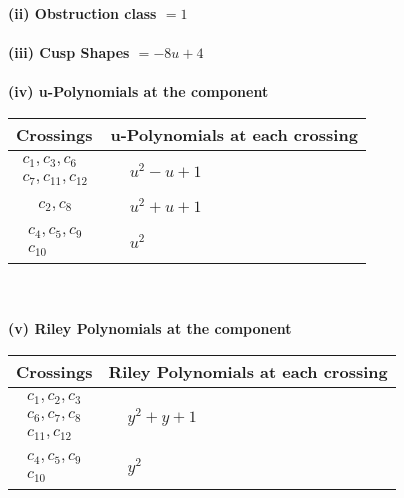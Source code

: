 \documentclass[1p]{elsarticle_modified}
\theoremstyle{definition}
\begin{document}
\flushleft \textbf{(ii) Obstruction class $= 1$}\\~\\
\flushleft \textbf{(iii) Cusp Shapes $= -8 u+4$}\\~\\
\newpage\renewcommand{\arraystretch}{1}
\flushleft \textbf{(iv) u-Polynomials at the component}\newline \\
\begin{tabular}{m{50pt}|m{274pt}}
Crossings & \hspace{64pt}u-Polynomials at each crossing \\
\hline $$\begin{aligned}c_{1},c_{3},c_{6}\\c_{7},c_{11},c_{12}\end{aligned}$$&$\begin{aligned}
&u^2- u+1
\end{aligned}$\\
\hline $$\begin{aligned}c_{2},c_{8}\end{aligned}$$&$\begin{aligned}
&u^2+u+1
\end{aligned}$\\
\hline $$\begin{aligned}c_{4},c_{5},c_{9}\\c_{10}\end{aligned}$$&$\begin{aligned}
&u^2
\end{aligned}$\\
\hline
\end{tabular}\\~\\
\newpage\renewcommand{\arraystretch}{1}
\flushleft \textbf{(v) Riley Polynomials at the component}\newline \\
\begin{tabular}{m{50pt}|m{274pt}}
Crossings & \hspace{64pt}Riley Polynomials at each crossing \\
\hline $$\begin{aligned}c_{1},c_{2},c_{3}\\c_{6},c_{7},c_{8}\\c_{11},c_{12}\end{aligned}$$&$\begin{aligned}
&y^2+y+1
\end{aligned}$\\
\hline $$\begin{aligned}c_{4},c_{5},c_{9}\\c_{10}\end{aligned}$$&$\begin{aligned}
&y^2
\end{aligned}$\\
\hline
\end{tabular}\\~\\
\end{document}
